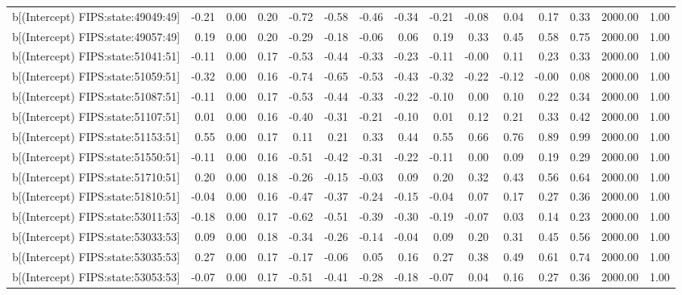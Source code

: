 \begin{table}[ht]
\begin{tabular}{rrrrrrrrrrrrrrr}
  b[(Intercept) FIPS:state:49049:49] & -0.21 & 0.00 & 0.20 & -0.72 & -0.58 & -0.46 & -0.34 & -0.21 & -0.08 & 0.04 & 0.17 & 0.33 & 2000.00 & 1.00 \\ 
  b[(Intercept) FIPS:state:49057:49] & 0.19 & 0.00 & 0.20 & -0.29 & -0.18 & -0.06 & 0.06 & 0.19 & 0.33 & 0.45 & 0.58 & 0.75 & 2000.00 & 1.00 \\ 
  b[(Intercept) FIPS:state:51041:51] & -0.11 & 0.00 & 0.17 & -0.53 & -0.44 & -0.33 & -0.23 & -0.11 & -0.00 & 0.11 & 0.23 & 0.33 & 2000.00 & 1.00 \\ 
  b[(Intercept) FIPS:state:51059:51] & -0.32 & 0.00 & 0.16 & -0.74 & -0.65 & -0.53 & -0.43 & -0.32 & -0.22 & -0.12 & -0.00 & 0.08 & 2000.00 & 1.00 \\ 
  b[(Intercept) FIPS:state:51087:51] & -0.11 & 0.00 & 0.17 & -0.53 & -0.44 & -0.33 & -0.22 & -0.10 & 0.00 & 0.10 & 0.22 & 0.34 & 2000.00 & 1.00 \\ 
  b[(Intercept) FIPS:state:51107:51] & 0.01 & 0.00 & 0.16 & -0.40 & -0.31 & -0.21 & -0.10 & 0.01 & 0.12 & 0.21 & 0.33 & 0.42 & 2000.00 & 1.00 \\ 
  b[(Intercept) FIPS:state:51153:51] & 0.55 & 0.00 & 0.17 & 0.11 & 0.21 & 0.33 & 0.44 & 0.55 & 0.66 & 0.76 & 0.89 & 0.99 & 2000.00 & 1.00 \\ 
  b[(Intercept) FIPS:state:51550:51] & -0.11 & 0.00 & 0.16 & -0.51 & -0.42 & -0.31 & -0.22 & -0.11 & 0.00 & 0.09 & 0.19 & 0.29 & 2000.00 & 1.00 \\ 
  b[(Intercept) FIPS:state:51710:51] & 0.20 & 0.00 & 0.18 & -0.26 & -0.15 & -0.03 & 0.09 & 0.20 & 0.32 & 0.43 & 0.56 & 0.64 & 2000.00 & 1.00 \\ 
  b[(Intercept) FIPS:state:51810:51] & -0.04 & 0.00 & 0.16 & -0.47 & -0.37 & -0.24 & -0.15 & -0.04 & 0.07 & 0.17 & 0.27 & 0.36 & 2000.00 & 1.00 \\ 
  b[(Intercept) FIPS:state:53011:53] & -0.18 & 0.00 & 0.17 & -0.62 & -0.51 & -0.39 & -0.30 & -0.19 & -0.07 & 0.03 & 0.14 & 0.23 & 2000.00 & 1.00 \\ 
  b[(Intercept) FIPS:state:53033:53] & 0.09 & 0.00 & 0.18 & -0.34 & -0.26 & -0.14 & -0.04 & 0.09 & 0.20 & 0.31 & 0.45 & 0.56 & 2000.00 & 1.00 \\ 
  b[(Intercept) FIPS:state:53035:53] & 0.27 & 0.00 & 0.17 & -0.17 & -0.06 & 0.05 & 0.16 & 0.27 & 0.38 & 0.49 & 0.61 & 0.74 & 2000.00 & 1.00 \\ 
  b[(Intercept) FIPS:state:53053:53] & -0.07 & 0.00 & 0.17 & -0.51 & -0.41 & -0.28 & -0.18 & -0.07 & 0.04 & 0.16 & 0.27 & 0.36 & 2000.00 & 1.00 \\ 

\end{tabular}
\end{table}
